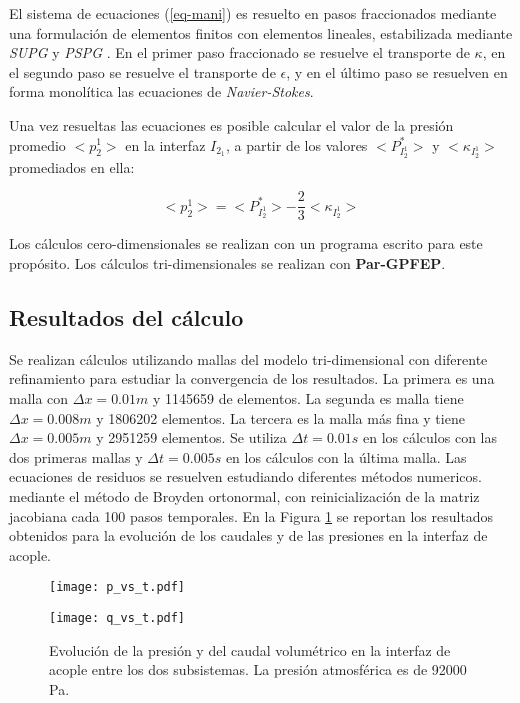 El sistema de ecuaciones (\ref{eq-mani}) es resuelto en pasos fraccionados \cite{lew} mediante una formulación de elementos finitos con elementos lineales, 
estabilizada mediante \textit{SUPG} \cite{supg} y \textit{PSPG} \cite{pspg}.
En el primer paso fraccionado se resuelve el transporte de $\kappa$,
en el segundo paso se resuelve el transporte de $\epsilon$,
y en el último paso se resuelven en forma monolítica las ecuaciones de \textit{Navier-Stokes}.

Una vez resueltas las ecuaciones es posible calcular el valor de la presión promedio $<p_2^1>$ en la interfaz $I_{2_1}$,
a partir de los valores $<P^*_{I_2^1}>$ y $<\kappa_{I_2^1}>$ promediados en ella:

\begin{equation}
<p_2^1> = <P^*_{I_2^1}> - \frac {2}{3} <\kappa_{I_2^1}>
\end{equation}

Los cálculos cero-dimensionales se realizan con un programa escrito para este propósito.
Los cálculos tri-dimensionales se realizan con \textbf{Par-GPFEP}.

\subsection*{Resultados del cálculo}

Se realizan cálculos utilizando mallas del modelo tri-dimensional con diferente refinamiento para estudiar la convergencia de los resultados.
La primera es una malla con $\Delta x=0.01m$ y 1145659 de elementos. 
La segunda es malla tiene $\Delta x=0.008m$ y 1806202 elementos.
La tercera es la malla más fina y tiene $\Delta x=0.005m$ y 2951259 elementos.
Se utiliza $\Delta t=0.01s$ en los cálculos con las dos primeras mallas y $\Delta t=0.005s$ en los cálculos con la última malla.
Las ecuaciones de residuos se resuelven estudiando diferentes métodos numericos.
mediante el método de Broyden ortonormal, 
con reinicialización de la matriz jacobiana cada 100 pasos temporales.
En la Figura \ref{qpvst} se reportan los resultados obtenidos para la evolución de los caudales y de las presiones en la interfaz de acople.

\begin{figure}[ht]
	\begin{minipage}{0.5\linewidth}
		\centering
		\texttt{[image: p\_vs\_t.pdf]}
		\label{asd}	
	\end{minipage}
	\begin{minipage}{0.5\linewidth}
		\centering
		\texttt{[image: q\_vs\_t.pdf]}
		\label{asd}	
	\end{minipage}
	\caption[Evolución de la presión y del caudal volumétrico en la interfaz de acople]
  {Evolución de la presión y del caudal volumétrico en la interfaz de acople entre los dos subsistemas.
  La presión atmosférica es de 92000 Pa.}  
	\label{qpvst}
\end{figure}

